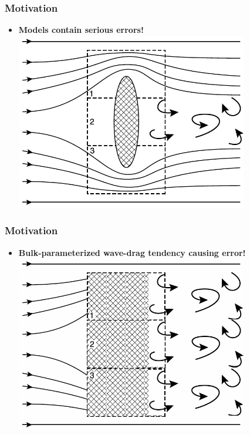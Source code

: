 \documentclass[graphics]{beamer}
\begin{document}
\begin{frame}[t]
   \frametitle{Motivation}
      \begin{itemize}
         \item {\bf Models contain serious errors!} %
             \includegraphics[width=0.8\textwidth, height=0.55\textwidth]{drag_param} 
      \end{itemize}
\end{frame}

\begin{frame}[t]
   \frametitle{Motivation}
      \begin{itemize}
         \item  {\bf Bulk-parameterized wave-drag tendency causing error!} %
               \includegraphics[width=0.8\textwidth, height=0.55\textwidth]{drag_param_bulk_turb} 
      \end{itemize}
\end{frame}
\end{document}
